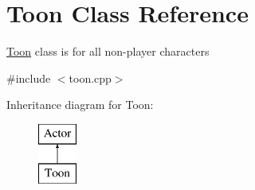 \hypertarget{classToon}{}\section{Toon Class Reference}
\label{classToon}


\mbox{\hyperlink{classToon}{Toon}} class is for all non-\/player characters ~\newline
  




{\ttfamily \#include $<$toon.\+cpp$>$}

Inheritance diagram for Toon\+:\begin{figure}[H]
\begin{center}
\leavevmode
\includegraphics[height=2.000000cm]{classToon}
\end{center}
\end{figure}
